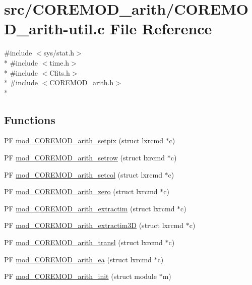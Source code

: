 \hypertarget{COREMOD__arith-util_8c}{\section{src/\+C\+O\+R\+E\+M\+O\+D\+\_\+arith/\+C\+O\+R\+E\+M\+O\+D\+\_\+arith-\/util.c File Reference}
\label{COREMOD__arith-util_8c}
}
{\ttfamily \#include $<$sys/stat.\+h$>$}\\*
{\ttfamily \#include $<$time.\+h$>$}\\*
{\ttfamily \#include $<$Cfits.\+h$>$}\\*
{\ttfamily \#include $<$C\+O\+R\+E\+M\+O\+D\+\_\+arith.\+h$>$}\\*
\subsection*{Functions}
\begin{DoxyCompactItemize}
\item 
P\+F \hyperlink{COREMOD__arith-util_8c_a620380159486515a9dca2152af7454d3}{mod\+\_\+\+C\+O\+R\+E\+M\+O\+D\+\_\+arith\+\_\+setpix} (struct lxrcmd $\ast$c)
\item 
P\+F \hyperlink{COREMOD__arith-util_8c_aeb885e652380aa903a6e8616f49fa72b}{mod\+\_\+\+C\+O\+R\+E\+M\+O\+D\+\_\+arith\+\_\+setrow} (struct lxrcmd $\ast$c)
\item 
P\+F \hyperlink{COREMOD__arith-util_8c_a3c3e340b012e1cf8ba8cfb44a66b5ccc}{mod\+\_\+\+C\+O\+R\+E\+M\+O\+D\+\_\+arith\+\_\+setcol} (struct lxrcmd $\ast$c)
\item 
P\+F \hyperlink{COREMOD__arith-util_8c_a81af934722c893a224dcfa7842c6c318}{mod\+\_\+\+C\+O\+R\+E\+M\+O\+D\+\_\+arith\+\_\+zero} (struct lxrcmd $\ast$c)
\item 
P\+F \hyperlink{COREMOD__arith-util_8c_a95b0d0150c59d81453d16eb3e7077dfd}{mod\+\_\+\+C\+O\+R\+E\+M\+O\+D\+\_\+arith\+\_\+extractim} (struct lxrcmd $\ast$c)
\item 
P\+F \hyperlink{COREMOD__arith-util_8c_a93d5a0872c60ae3979f40eff64fc74b7}{mod\+\_\+\+C\+O\+R\+E\+M\+O\+D\+\_\+arith\+\_\+extractim3\+D} (struct lxrcmd $\ast$c)
\item 
P\+F \hyperlink{COREMOD__arith-util_8c_afd1b0b14e6fb6a813244270a1dd4e3c3}{mod\+\_\+\+C\+O\+R\+E\+M\+O\+D\+\_\+arith\+\_\+transl} (struct lxrcmd $\ast$c)
\item 
P\+F \hyperlink{COREMOD__arith-util_8c_a178389ee1bb679a23f3be9e935664e67}{mod\+\_\+\+C\+O\+R\+E\+M\+O\+D\+\_\+arith\+\_\+ea} (struct lxrcmd $\ast$c)
\item 
P\+F \hyperlink{COREMOD__arith-util_8c_a71c6f02204c17f2a98eb151b35c642aa}{mod\+\_\+\+C\+O\+R\+E\+M\+O\+D\+\_\+arith\+\_\+init} (struct module $\ast$m)
\end{DoxyCompactItemize}
